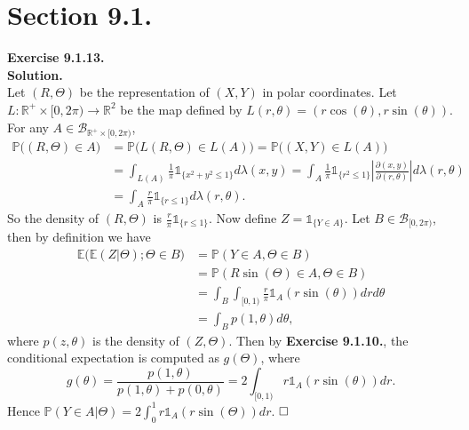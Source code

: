 \documentclass[12pt]{extarticle}
\begin{document}
\section*{Section 9.1.}
\textbf{Exercise 9.1.13.}\\
\textbf{Solution.}\\
Let $(R,\Theta)$ be the representation of $(X,Y)$ in polar coordinates. Let $L:\mathbb{R}^+\times[0,2\pi)\rightarrow\mathbb{R}^2$ be the map defined by $L(r,\theta)=(r\cos(\theta),r\sin(\theta))$. For any $A\in\mathcal{B}_{\mathbb{R}^+\times[0,2\pi)}$,
\begin{equation*}
\begin{aligned}
\mathbb{P}\big((R,\Theta)\in A\big) &= \mathbb{P}\big(L(R,\Theta)\in L(A)\big)=\mathbb{P}\big((X,Y)\in L(A)\big) \\&
=\int_{L(A)}\frac{1}{\pi}\mathds{1}_{\{x^2+y^2\leq 1\}}d\lambda(x,y)
=\int_A\frac{1}{\pi}\mathds{1}_{\{r^2\leq 1\}}\left|\frac{\partial(x,y)}{\partial(r,\theta)}\right|d\lambda(r,\theta) \\&
=\int_A\frac{r}{\pi}\mathds{1}_{\{r\leq 1\}}d\lambda(r,\theta).
\end{aligned}
\end{equation*}
So the density of $(R,\Theta)$ is $\frac{r}{\pi}\mathds{1}_{\{r\leq 1\}}$. Now define $Z=\mathds{1}_{\{Y\in A\}}$. Let $B\in\mathcal{B}_{[0,2\pi)}$, then by definition we have
\begin{equation*}
\begin{aligned}
\mathbb{E}\big(\mathbb{E}(Z|\Theta);\Theta\in B\big)&=\mathbb{P}(Y\in A,\Theta\in B) \\&
=\mathbb{P}(R\sin(\Theta)\in A,\Theta\in B) \\&
=\int_B\int_{[0,1)}\frac{r}{\pi}\mathds{1}_{A}(r\sin(\theta))dr d\theta \\&
=\int_Bp(1,\theta)d\theta,
\end{aligned}
\end{equation*}
where $p(z,\theta)$ is the density of $(Z,\Theta)$. Then by \textbf{Exercise 9.1.10.}, the conditional expectation is computed as $g(\Theta)$, where
\begin{equation*}
g(\theta)=\frac{p(1,\theta)}{p(1,\theta)+p(0,\theta)}=2\int_{[0,1)}r\mathds{1}_A(r\sin(\theta))dr.
\end{equation*}
Hence $\mathbb{P}(Y\in A|\Theta)=2\int_0^1r\mathds{1}_A(r\sin(\Theta))dr$.
$\hspace{\fill}\square$
\end{document}
